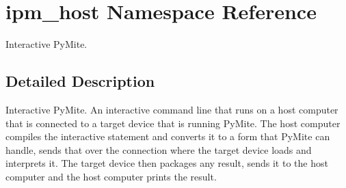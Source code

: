 \hypertarget{namespaceipm__host}{\section{ipm\-\_\-host Namespace Reference}
\label{namespaceipm__host}
}


Interactive Py\-Mite.  




\subsection{Detailed Description}
Interactive Py\-Mite. An interactive command line that runs on a host computer that is connected to a target device that is running Py\-Mite. The host computer compiles the interactive statement and converts it to a form that Py\-Mite can handle, sends that over the connection where the target device loads and interprets it. The target device then packages any result, sends it to the host computer and the host computer prints the result. 